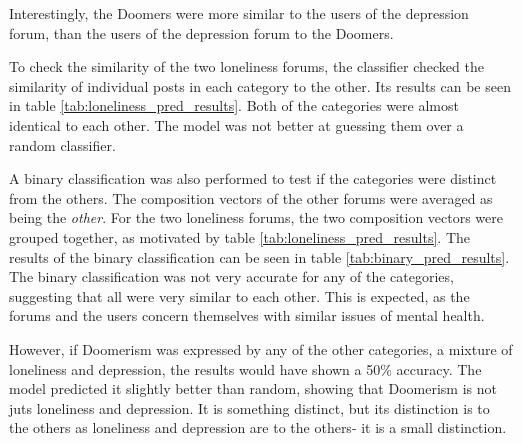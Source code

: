 \documentclass[../report.tex]{subfiles}
\begin{document}
Interestingly, the Doomers were more similar to the users of the depression forum, than the users of the depression forum to the Doomers. 

To check the similarity of the two loneliness forums, the classifier checked the similarity of individual posts in each category to the other. 
Its results can be seen in table \ref{tab:loneliness_pred_results}.
Both of the categories were almost identical to each other. 
The model was not better at guessing them over a random classifier.

A binary classification was also performed to test if the categories were distinct from the others.
The composition vectors of the other forums were averaged as being the \textit{other}.
For the two loneliness forums, the two composition vectors were grouped together, as motivated by table \ref{tab:loneliness_pred_results}.
The results of the binary classification can be seen in table \ref{tab:binary_pred_results}.
The binary classification was not very accurate for any of the categories, suggesting that all were very similar to each other. 
This is expected, as the forums and the users concern themselves with similar issues of mental health.

However, if Doomerism was expressed by any of the other categories, a mixture of loneliness and depression, the results would have shown a 50\% accuracy. 
The model predicted it slightly better than random, showing that Doomerism is not juts loneliness and depression.
It is something distinct, but its distinction is to the others as loneliness and depression are to the others\-- it is a small distinction.



	
\end{document}
